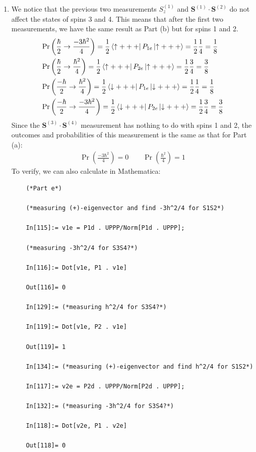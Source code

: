\documentclass{article}
\theoremstyle{definition}
\newcommand{\f}[2]{\frac{#1}{#2}}
\newcommand{\lp}{\left(}
\newcommand{\rp}{\right)}
\begin{document}
\begin{enumerate}[label=(\alph*)]
	
	\item We  notice that the previous two measurements $S_z^{(1)}$ and $\mathbf{S}^{(1)}\cdot \mathbf{S}^{(2)}$ do not affect the states of spins 3 and 4. This means that after the first two measurements, we have the same result as Part (b) but for spins 1 and 2. 
	\begin{align*}
	&\Pr\lp \f{\hbar}{2} \to \f{-3\hbar^2}{4} \rp = \f{1}{2} \bra{\uparrow +++} P_{1e} \ket{\uparrow +++} = \f{1}{2}\f{1}{4} = \f{1}{8} \\
	&\Pr\lp \f{\hbar}{2} \to \f{\hbar^2}{4} \rp =  \f{1}{2} \bra{\uparrow +++} P_{2e} \ket{\uparrow +++} = \f{1}{2}\f{3}{4} = \f{3}{8}\\
	&\Pr\lp \f{-\hbar}{2} \to \f{\hbar^2}{4} \rp =  \f{1}{2} \bra{\downarrow +++} P_{1e} \ket{\downarrow +++} = \f{1}{2}\f{1}{4} = \f{1}{8}\\
	&\Pr\lp \f{-\hbar}{2} \to \f{-3\hbar^2}{4} \rp =  \f{1}{2} \bra{\downarrow +++} P_{2e} \ket{\downarrow +++} = \f{1}{2}\f{3}{4} = \f{3}{8}
	\end{align*}
	Since the $\mathbf{S}^{(3)}\cdot \mathbf{S}^{(4)}$ measurement has nothing to do with spins 1 and 2, the outcomes and probabilities of this measurement is the same as that for Part (a):
	\begin{align*}
	\boxed{\Pr\lp \f{-3\hbar^2}{4} \rp = 0} \quad\quad \boxed{\Pr\lp \f{\hbar^2}{4} \rp = 1}
	\end{align*}
	To verify, we can also calculate in Mathematica:
	\begin{lstlisting}
	(*Part e*)
	
	(*measuring (+)-eigenvector and find -3h^2/4 for S1S2*)
	
	In[115]:= v1e = P1d . UPPP/Norm[P1d . UPPP];
	
	(*measuring -3h^2/4 for S3S4?*)
	
	In[116]:= Dot[v1e, P1 . v1e]
	
	Out[116]= 0
	
	In[129]:= (*measuring h^2/4 for S3S4?*)
	
	In[119]:= Dot[v1e, P2 . v1e]
	
	Out[119]= 1
	
	In[134]:= (*measuring (+)-eigenvector and find h^2/4 for S1S2*)
	
	In[117]:= v2e = P2d . UPPP/Norm[P2d . UPPP];
	
	In[132]:= (*measuring -3h^2/4 for S3S4?*)
	
	In[118]:= Dot[v2e, P1 . v2e]
	
	Out[118]= 0
	

\end{lstlisting}
\end{enumerate}
\end{document}
